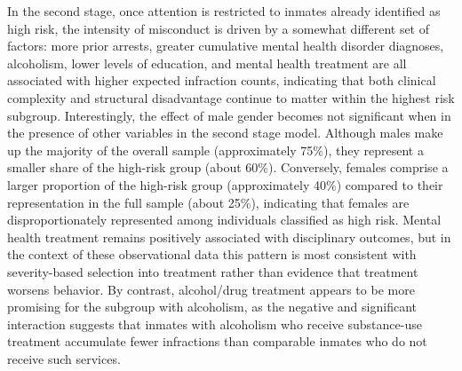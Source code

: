 \documentclass[
]{article}
\begin{document}
In the second stage, once attention is restricted to inmates already
identified as high risk, the intensity of misconduct is driven by a
somewhat different set of factors: more prior arrests, greater
cumulative mental health disorder diagnoses, alcoholism, lower levels of
education, and mental health treatment are all associated with higher
expected infraction counts, indicating that both clinical complexity and
structural disadvantage continue to matter within the highest risk
subgroup. Interestingly, the effect of male gender becomes not
significant when in the presence of other variables in the second stage
model. Although males make up the majority of the overall sample
(approximately 75\%), they represent a smaller share of the high-risk
group (about 60\%). Conversely, females comprise a larger proportion of
the high-risk group (approximately 40\%) compared to their
representation in the full sample (about 25\%), indicating that females
are disproportionately represented among individuals classified as high
risk. Mental health treatment remains positively associated with
disciplinary outcomes, but in the context of these observational data
this pattern is most consistent with severity-based selection into
treatment rather than evidence that treatment worsens behavior. By
contrast, alcohol/drug treatment appears to be more promising for the
subgroup with alcoholism, as the negative and significant interaction
suggests that inmates with alcoholism who receive substance-use
treatment accumulate fewer infractions than comparable inmates who do
not receive such services.
\end{document}
